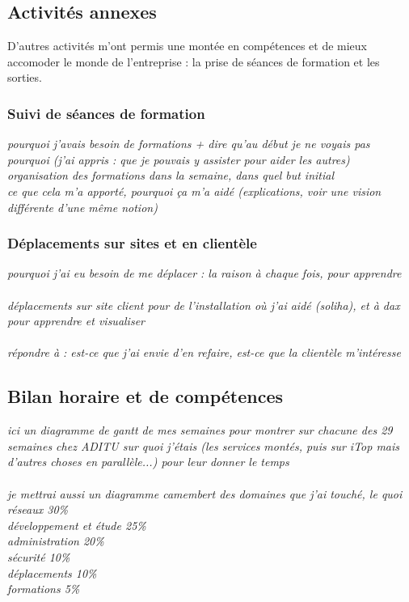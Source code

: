 \subsection{Activités annexes}

D'autres activités m'ont permis une montée en compétences et de mieux accomoder le monde de l'entreprise : la prise de séances de formation et les sorties.

\subsubsection{Suivi de séances de formation}

\textit{pourquoi j'avais besoin de formations + dire qu'au début je ne voyais pas pourquoi (j'ai appris : que je pouvais y assister pour aider les autres)}
\\
\textit{organisation des formations dans la semaine, dans quel but initial}
\\
\textit{ce que cela m'a apporté, pourquoi ça m'a aidé (explications, voir une vision différente d'une même notion)}

\subsubsection{Déplacements sur sites et en clientèle}

\textit{pourquoi j'ai eu besoin de me déplacer : la raison à chaque fois, pour apprendre}
\\ \\
\textit{déplacements sur site client pour de l'installation où j'ai aidé (soliha), et à dax pour apprendre et visualiser}
\\ \\
\textit{répondre à : est-ce que j'ai envie d'en refaire, est-ce que la clientèle m'intéresse}

\subsection{Bilan horaire et de compétences}

\textit{ici un diagramme de gantt de mes semaines pour montrer sur chacune des 29 semaines chez ADITU sur quoi j'étais (les services montés, puis sur iTop mais d'autres choses en parallèle...) pour leur donner le temps}
\\ \\
\textit{je mettrai aussi un diagramme camembert des domaines que j'ai touché, le quoi\\
réseaux 30\%
\\
développement et étude 25\%
\\
administration 20\%
\\
sécurité 10\%
\\
déplacements 10\%
\\
formations 5\%}

\newpage